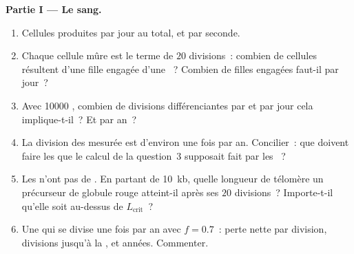 \begin{problem}
\medskip
\noindent\textbf{Partie I --- Le sang.}
\begin{enumerate}
  \item Cellules produites par jour au total, et par seconde.
  \item Chaque cellule mûre est le terme de $20$ divisions~: combien de
        cellules résultent d'une fille engagée d'une ~?
        Combien de filles engagées faut-il par jour~?
  \item Avec \num{10000} , combien de divisions
        différenciantes par  et par jour cela implique-t-il~?
        Et par an~?
  \item La division des  mesurée est d'environ une fois
        par an. Concilier~: que doivent faire les  que le
        calcul de la question~3 supposait fait par les ~?
  \item Les  n'ont pas de . En partant de
        \qty{10}{kb}, quelle longueur de télomère un précurseur de
        globule rouge atteint-il après ses $20$ divisions~? Importe-t-il
        qu'elle soit au-dessus de $L_{\text{crit}}$~?
  \item Une  qui se divise une fois par an avec $f = 0.7$~:
        perte nette par division, divisions jusqu'à la , et
        années. Commenter.
\end{enumerate}


\end{problem}

